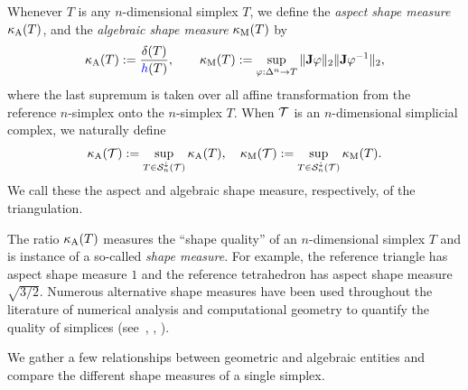 \documentclass[10pt,a4paper]{article}
\begin{document}
Whenever $T$ is any $n$-dimensional simplex $T$,
we define the \textit{aspect shape measure} $\kappa_{\rm A}(T)$,
and 
the \textit{algebraic shape measure} $\kappa_{\rm M}(T)$
by 
\begin{align}\label{math:shapemeasure}
    \aspectratio(T)
    := 
    \frac{ \diam(T) }{ \height(T) }
    ,
    \qquad 
    \algebraicshapemeasure(T)
    := 
    \sup_{ \varphi : \Delta^n \rightarrow T } 
    \matnorm{\Jacobian \varphi} \matnorm{ \Jacobian \varphi^{-1} }
    ,
\end{align}
where the last supremum is taken over all affine transformation from the reference $n$-simplex onto the $n$-simplex $T$. 
When ${\mathcal T}$ is an $n$-dimensional simplicial complex, we naturally define 
\begin{align}\label{math:shapemeasure:triangulation}
    \kappa_{\rm A}({\mathcal T}) := \sup_{ T \in {\mathcal S}^{\downarrow}_{n}({\mathcal T}) } \kappa_{\rm A}(T)
    ,
    \quad 
    \kappa_{\rm M}({\mathcal T}) := \sup_{ T \in {\mathcal S}^{\downarrow}_{n}({\mathcal T}) } \kappa_{\rm M}(T)
    .
\end{align}
We call these the aspect and algebraic shape measure, respectively, of the triangulation. 

\begin{remark}
    The ratio $\kappa_{\rm A}(T)$ measures the ``shape quality'' of an $n$-dimensional simplex $T$ and is instance of a so-called \emph{shape measure}.
    For example, the reference triangle has aspect shape measure $1$ and the reference tetrahedron has aspect shape measure $\sqrt{3/2}$. 
    Numerous alternative shape measures have been used throughout the literature of numerical analysis and computational geometry to quantify the quality of simplices (see~\cite[p.61, Definition 5.1]{braess2001finite}, 
    \cite[p.97, Definition 4.2.16 ]{brenner2008mathematical}, %
    \cite[Definition~11.2]{ern2021finite}). 
\end{remark}

We gather a few relationships between geometric and algebraic entities and compare the different shape measures of a single simplex.
\end{document}

